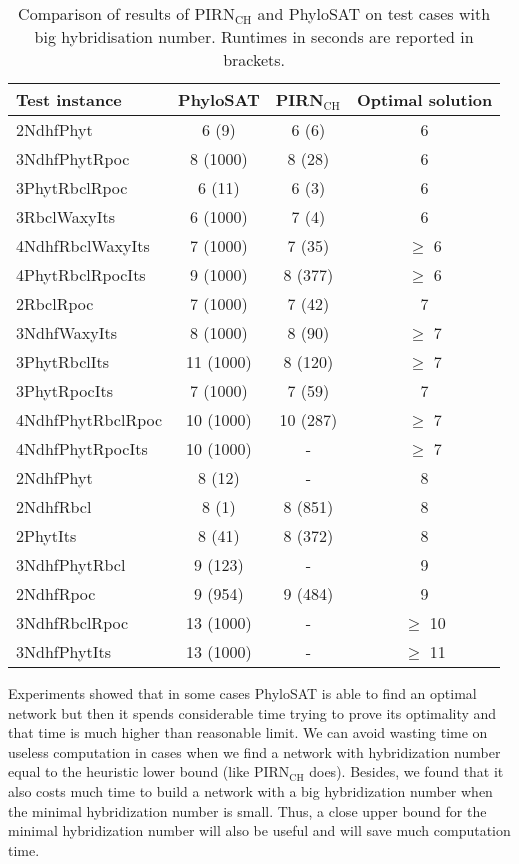 \documentclass[runningheads, envcountsame, a4paper]{llncs}
\begin{document}
\begin{table}[t]
\centering
\caption{Comparison of results of PIRN$\mathrm{_{CH}}$ and PhyloSAT on test cases with big hybridisation number. Runtimes in seconds are reported in brackets.}
\begin{tabular}{l | c | c | c}
  Test instance & PhyloSAT & PIRN$\mathrm{_{CH}}$ & Optimal solution \\
  \hline
  2NdhfPhyt & 6 (9) & 6 (6) & 6 \\
  3NdhfPhytRpoc & 8 (1000) & 8 (28) & 6 \\
  3PhytRbclRpoc & 6 (11) & 6 (3) & 6 \\
  3RbclWaxyIts & 6 (1000) & 7 (4) & 6 \\
  4NdhfRbclWaxyIts & 7 (1000) & 7 (35) & $\geq$ 6 \\
  4PhytRbclRpocIts & 9 (1000) & 8 (377) & $\geq$ 6 \\
  2RbclRpoc & 7 (1000) & 7 (42) & 7 \\
  3NdhfWaxyIts & 8 (1000) & 8 (90) & $\geq$ 7 \\
  3PhytRbclIts & 11 (1000) & 8 (120) & $\geq$ 7 \\
  3PhytRpocIts & 7 (1000) & 7 (59) & 7 \\
  4NdhfPhytRbclRpoc & 10 (1000) & 10 (287) & $\geq$ 7 \\
  4NdhfPhytRpocIts & 10 (1000) & - & $\geq$ 7 \\
  2NdhfPhyt & 8 (12) & - & 8 \\
  2NdhfRbcl & 8 (1) & 8 (851) & 8 \\
  2PhytIts & 8 (41) & 8 (372) & 8 \\
  3NdhfPhytRbcl & 9 (123) & - & 9 \\
  2NdhfRpoc & 9 (954) & 9 (484) & 9 \\
  3NdhfRbclRpoc & 13 (1000) & - & $\geq$ 10 \\
  3NdhfPhytIts & 13 (1000) & - & $\geq$ 11 \\
  
\end{tabular}
\label{detailed-results}
\end{table}

Experiments showed that in some cases PhyloSAT is able to find an optimal network but then it spends considerable time trying to prove its optimality 
and that time is much higher than reasonable limit. We can avoid wasting time on useless computation 
in cases when we find a network with hybridization number equal to the heuristic lower bound (like PIRN$\mathrm{_{CH}}$ does). Besides, we found 
that it also costs much time to build a network with a big hybridization number when the minimal hybridization number is small. 
Thus, a close upper bound for the minimal hybridization number will also be useful and will save much computation time.
\end{document}
